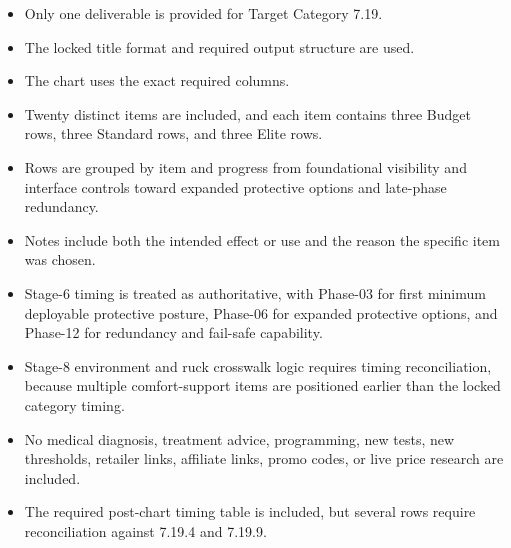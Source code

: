 \documentclass[10pt]{article}
\begin{document}
\begin{landscape}
\begin{itemize}
\item Only one deliverable is provided for Target Category 7.19.
\item The locked title format and required output structure are used.
\item The chart uses the exact required columns.
\item Twenty distinct items are included, and each item contains three Budget rows, three Standard rows, and three Elite rows.
\item Rows are grouped by item and progress from foundational visibility and interface controls toward expanded protective options and late-phase redundancy.
\item Notes include both the intended effect or use and the reason the specific item was chosen.
\item Stage-6 timing is treated as authoritative, with Phase-03 for first minimum deployable protective posture, Phase-06 for expanded protective options, and Phase-12 for redundancy and fail-safe capability.
\item Stage-8 environment and ruck crosswalk logic requires timing reconciliation, because multiple comfort-support items are positioned earlier than the locked category timing.
\item No medical diagnosis, treatment advice, programming, new tests, new thresholds, retailer links, affiliate links, promo codes, or live price research are included.
\item The required post-chart timing table is included, but several rows require reconciliation against 7.19.4 and 7.19.9.
\end{itemize}

\end{landscape}
\end{document}
